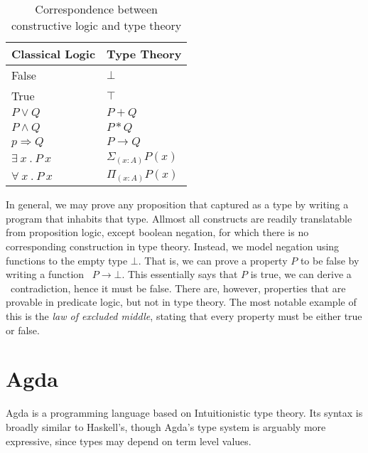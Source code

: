 \documentclass[a4paper,msc,twosized=semi]{uustthesis}
\let\oldemph\emph
\renewcommand\emph[1]{{\large\oldemph{#1}}}
\begin{document}
\begin{table}[h]\label{tbl:chiso}
\begin{center}\begin{framed}
\begin{tabular}{ll}
\multicolumn{1}{c}{\textbf{Classical Logic}} & \textbf{Type Theory} \\ \hline \hline
False                                        & $\bot$               \\
True                                         & $\top$               \\
$P \vee Q$                                   & $P + Q$              \\
$P \wedge Q$                                 & $P * Q$              \\
$p \Rightarrow Q$                            & $P \rightarrow Q$    \\
$\exists\ x\ .\ P\ x$                        & $\Sigma_{(x : A)} P(x)$ \\
$\forall\ x\ .\ P\ x$                        & $\Pi_{(x : A)} P(x)$                   
\end{tabular}
\caption{Correspondence between constructive logic and type theory}
\end{framed}\end{center}
\end{table}

  In general, we may prove any proposition that captured as a type by writing a 
  program that inhabits that type. Allmost all constructs are readily translatable 
  from proposition logic, except boolean negation, for which there is no corresponding 
  construction in type theory. Instead, we model negation using functions to the empty 
  type $\bot$. That is, we can prove a property $P$ to be false by writing a function \
  $P \rightarrow \bot$. This essentially says that $P$ is true, we can derive a \
  contradiction, hence it must be false. There are, however, properties that are 
  provable in predicate logic, but not in type theory. The most notable example of this 
  is the \emph{law of excluded middle}, stating that every property must be either true 
  or false. 

\section{Agda}

  Agda is a programming language based on Intuitionistic type theory\cite
  {norell2008dependently}. Its syntax is broadly similar to Haskell's, though Agda's 
  type system is arguably more expressive, since types may depend on term level 
  values. 
\end{document}
